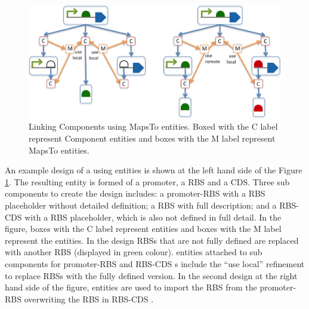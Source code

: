 
\begin{figure}[ht]
\begin{center}
\includegraphics[scale=1]{images/MapsTo_Diagram2}
\caption{Linking Components using MapsTo entities. Boxed with the C label represent Component entities and boxes with the M label represent MapsTo entities.}
\label{image:maps_to_diagram2}
\end{center}
\end{figure}

An example design of a  using  entities is shown at the left hand side of the Figure \ref{image:maps_to_diagram2}. The resulting entity is formed of a promoter, a RBS and a CDS. 
Three sub components to create the design includes: a promoter-RBS  with a RBS placeholder without detailed definition; a RBS  with full description; and a RBS-CDS  with a RBS placeholder, which is also not defined in full detail. 
In the figure, boxes with the C label represent  entities and boxes with the M label represent the  entities.
In the design RBSs that are not fully defined are replaced with another RBS  (displayed in green colour).  entities attached to sub components for promoter-RBS and RBS-CDS s include the ``use local'' refinement to replace RBSs with the fully defined version. In the second design at the right hand side of the figure,  entities are used to import the RBS from the promoter-RBS  overwriting the RBS in RBS-CDS . 

